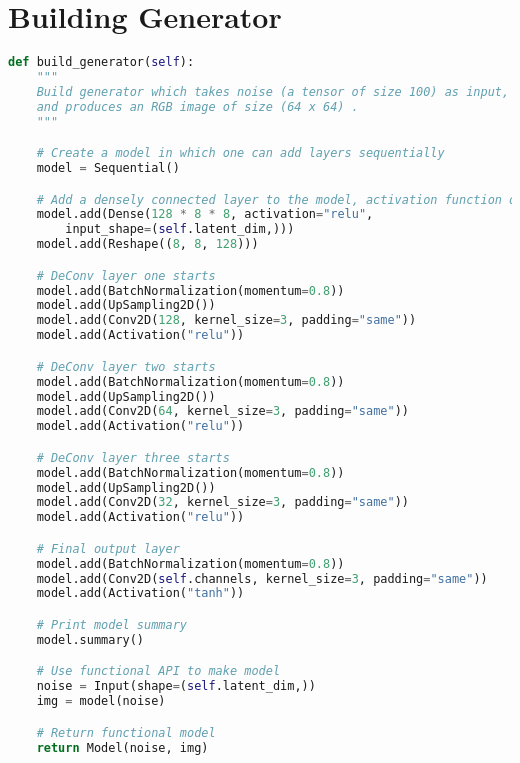 
\section{Building Generator} %
\label{sec:building_generator}

\begin{lstlisting}[basicstyle=\scriptsize,language=Python]
def build_generator(self):
    """
    Build generator which takes noise (a tensor of size 100) as input,
    and produces an RGB image of size (64 x 64) .
    """

    # Create a model in which one can add layers sequentially
    model = Sequential()

    # Add a densely connected layer to the model, activation function of ReLu
    model.add(Dense(128 * 8 * 8, activation="relu", 
        input_shape=(self.latent_dim,)))
    model.add(Reshape((8, 8, 128)))

    # DeConv layer one starts
    model.add(BatchNormalization(momentum=0.8))
    model.add(UpSampling2D())
    model.add(Conv2D(128, kernel_size=3, padding="same"))
    model.add(Activation("relu"))

    # DeConv layer two starts
    model.add(BatchNormalization(momentum=0.8))
    model.add(UpSampling2D())
    model.add(Conv2D(64, kernel_size=3, padding="same"))
    model.add(Activation("relu"))

    # DeConv layer three starts
    model.add(BatchNormalization(momentum=0.8))
    model.add(UpSampling2D())
    model.add(Conv2D(32, kernel_size=3, padding="same"))
    model.add(Activation("relu"))

    # Final output layer
    model.add(BatchNormalization(momentum=0.8))
    model.add(Conv2D(self.channels, kernel_size=3, padding="same"))
    model.add(Activation("tanh"))

    # Print model summary
    model.summary()

    # Use functional API to make model
    noise = Input(shape=(self.latent_dim,))
    img = model(noise)

    # Return functional model
    return Model(noise, img)

\end{lstlisting}

